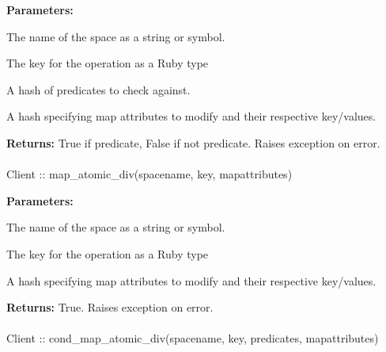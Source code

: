 \noindent\textbf{Parameters:}
\begin{description}[labelindent=\widthof{{\code{mapattributes}}},leftmargin=*,noitemsep,nolistsep,align=right]
\item[\code{spacename}] The name of the space as a string or symbol.
\item[\code{key}] The key for the operation as a Ruby type
\item[\code{predicates}] A hash of predicates to check against.
\item[\code{mapattributes}] A hash specifying map attributes to modify and their respective key/values.
\end{description}

\noindent\textbf{Returns:}
True if predicate, False if not predicate.  Raises exception on error.

\paragraph{}
\label{api:ruby:map_atomic_div}
\begin{rubycode}
Client :: map_atomic_div(spacename, key, mapattributes)
\end{rubycode}


\noindent\textbf{Parameters:}
\begin{description}[labelindent=\widthof{{\code{mapattributes}}},leftmargin=*,noitemsep,nolistsep,align=right]
\item[\code{spacename}] The name of the space as a string or symbol.
\item[\code{key}] The key for the operation as a Ruby type
\item[\code{mapattributes}] A hash specifying map attributes to modify and their respective key/values.
\end{description}

\noindent\textbf{Returns:}
True.  Raises exception on error.

\paragraph{}
\label{api:ruby:cond_map_atomic_div}
\begin{rubycode}
Client :: cond_map_atomic_div(spacename, key, predicates, mapattributes)
\end{rubycode}


